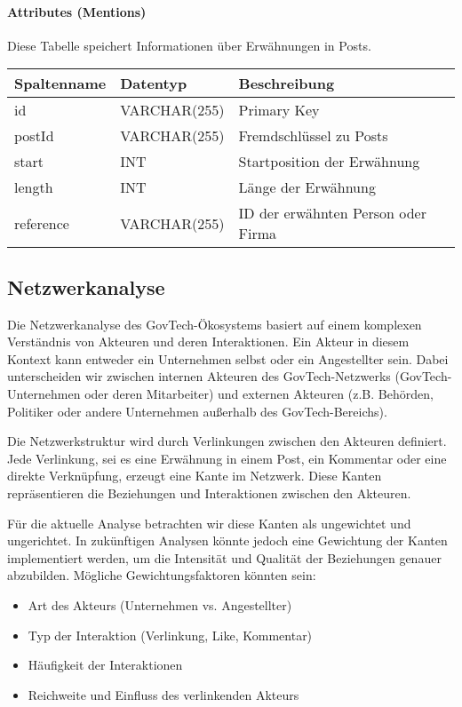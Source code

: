 \documentclass[a4paper,11pt]{article}
\begin{document}
\paragraph{Attributes (Mentions)}
Diese Tabelle speichert Informationen über Erwähnungen in Posts.

\begin{table}[h]
\begin{tabular}{|l|l|l|}
\hline
\textbf{Spaltenname} & \textbf{Datentyp} & \textbf{Beschreibung} \\
\hline
id & VARCHAR(255) & Primary Key \\
postId & VARCHAR(255) & Fremdschlüssel zu Posts \\
start & INT & Startposition der Erwähnung \\
length & INT & Länge der Erwähnung \\
reference & VARCHAR(255) & ID der erwähnten Person oder Firma \\
\hline
\end{tabular}
\end{table}
\subsection{Netzwerkanalyse}

Die Netzwerkanalyse des GovTech-Ökosystems basiert auf einem komplexen Verständnis von Akteuren und deren Interaktionen. Ein Akteur in diesem Kontext kann entweder ein Unternehmen selbst oder ein Angestellter sein. Dabei unterscheiden wir zwischen internen Akteuren des GovTech-Netzwerks (GovTech-Unternehmen oder deren Mitarbeiter) und externen Akteuren (z.B. Behörden, Politiker oder andere Unternehmen außerhalb des GovTech-Bereichs).

Die Netzwerkstruktur wird durch Verlinkungen zwischen den Akteuren definiert. Jede Verlinkung, sei es eine Erwähnung in einem Post, ein Kommentar oder eine direkte Verknüpfung, erzeugt eine Kante im Netzwerk. Diese Kanten repräsentieren die Beziehungen und Interaktionen zwischen den Akteuren.

Für die aktuelle Analyse betrachten wir diese Kanten als ungewichtet und ungerichtet. In zukünftigen Analysen könnte jedoch eine Gewichtung der Kanten implementiert werden, um die Intensität und Qualität der Beziehungen genauer abzubilden. Mögliche Gewichtungsfaktoren könnten sein:

\begin{itemize}
    \item Art des Akteurs (Unternehmen vs. Angestellter)
    \item Typ der Interaktion (Verlinkung, Like, Kommentar)
    \item Häufigkeit der Interaktionen
    \item Reichweite und Einfluss des verlinkenden Akteurs
\end{itemize}
\end{document}
